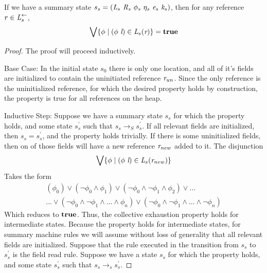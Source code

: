 \begin{theorem}
\label{thm:colex}
If we have a summary state $s_s = ( \cfgnt{L}_s\ \cfgnt{R}_s\ \phi_s\ \eta_s\ \cfgnt{e}_s\ \cfgnt{k}_s )$, then for any reference $r \in \emph{L}_s^\leftarrow$, 
$$\bigvee \{ \phi \mid (\phi\ \emph{l})\in \emph{L}_s (\emph{r})\} = \textbf{true}$$
\end{theorem}
\begin{proof}
The proof will proceed inductively.

Base Case: In the initial state $s_0$ there is only one location, and all of it's fields are initialized to contain the uninitiated reference $\emph{r}_{un}$. Since the only reference is the uninitialized reference, for which the desired property holds by construction, the property is true for all references on the heap.

Inductive Step: 
Suppose we have a summary state $s_s$ for which the property holds, and some state $s_s^\prime$ such that $s_s \rightarrow_S s_s^\prime$. If all relevant fields are initialized, then $s_s = s_s^\prime$, and the property holds trivially. If there is some uninitialized fields, then on of those fields will have a new reference $\emph{r}_{new}$ added to it. The disjunction
$$ \bigvee \{ \phi \mid (\phi\ \cfgnt{l})\in \cfgnt{L}_s (\cfgnt{r}_{new})\}$$
Takes the form
\begin{align*}
 (\phi_0) \vee (\neg \phi_0 \wedge \phi_1) \vee (\neg \phi_0 \wedge \neg \phi_1 \wedge \phi_2) \vee ...\\
 ... \vee (\neg \phi_0 \wedge \neg \phi_1 \wedge ... \wedge \phi_n) \vee (\neg \phi_0 \wedge \neg \phi_1 \wedge ... \wedge \neg \phi_n)
 \end{align*}
 Which reduces to $\textbf{true}$. Thus, the collective exhaustion property holds for intermediate states. Because the property holds for intermediate states, for summary machine rules we will assume without loss of generality that all relevant fields are initialized. 
 Suppose that the rule executed in the transition from $s_s$ to $s_s^\prime$ is the field read rule. 
Suppose we have a state $s_s$ for which the property holds, and some state $s_s^\prime$ such that $s_s \rightarrow_s s_s^\prime$. 
 
\end{proof}
